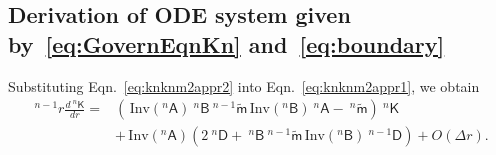 \documentclass[preprint,10pt,times]{elsarticle}
\numberwithin{equation}{section}
\renewcommand{\u}[1]{\boldsymbol{#1}}
\newcommand{\usf}[1]{\u{\mathsf #1}}
\newcommand{\pr}[1]{\left( #1 \right)}
\newcommand{\Inv}{\,\mathrm{Inv}}
\renewcommand{\>}{$\Rightarrow$}
\begin{document}
\subsection{Derivation of ODE system given by~\eqref{eq:GovernEqnKn} and~\eqref{eq:boundary}}
\label{Appen:GovernEqnKn}

Substituting Eqn.~\eqref{eq:knknm2appr2} into Eqn.~\eqref{eq:knknm2appr1}, we obtain
\begin{equation}
	\begin{aligned}
		~^{n-1}\!{r} \frac{d ~^{n}{\usf{K}}}{dr} = & \left( \Inv\pr{{}^{n}\usf{A}} ~^{n}{\usf{B}} ~^{n-1}\tilde{\usf{m}} \Inv\pr{{}^{n}\usf{B}} ~^{n}{\usf{A}} - ~^{n}\tilde{\usf{m}} \right) ~^{n}{\usf{K}} \\
		& + \Inv\pr{{}^{n}\usf{A}} \left( 2~^{n}{\usf{D}} + ~^{n}{\usf{B}} ~^{n-1}\tilde{\usf{m}} \Inv\pr{{}^{n}\usf{B}} ~^{{n-1}}{\usf{D}} \right) + O(\Delta r).
	\end{aligned}
	\label{eq:AppendKndr1}
\end{equation}
\end{document}
